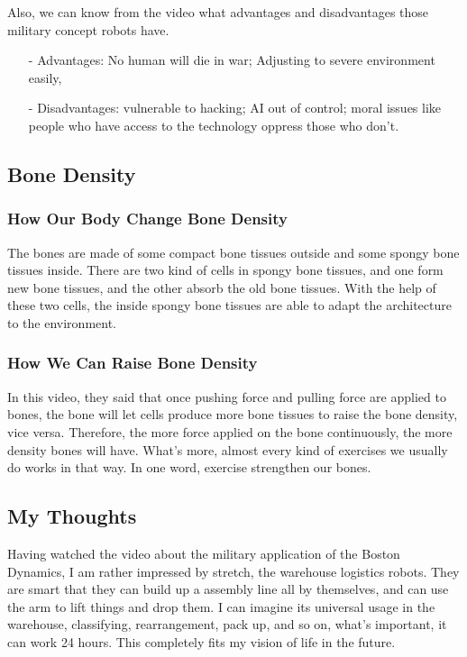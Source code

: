 \documentclass{article}
\begin{document}
Also, we can know from the video what advantages and disadvantages those military concept robots have.
\begin{enumerate}
	\item[-] Advantages: No human will die in war; Adjusting to severe environment easily,
	\item[-] Disadvantages: vulnerable to hacking; AI out of control; moral issues like people who have access to the technology oppress those who don't.
\end{enumerate}

\subsection{Bone Density}
\subsubsection{How Our Body Change Bone Density}
The bones are made of some compact bone tissues outside and some spongy bone tissues inside. There are two kind of cells in spongy bone tissues, and one form new bone tissues, and the other absorb the old bone tissues. With the help of these two cells, the inside spongy bone tissues are able to adapt the architecture to the environment. 

\subsubsection{How We Can Raise Bone Density}
In this video, they said that once pushing force and pulling force are applied to bones, the bone will let cells produce more bone tissues to raise the bone density, vice versa. Therefore, the more force applied on the bone continuously, the more density bones will have. What's more, almost every kind of exercises we usually do works in that way. In one word, exercise strengthen our bones.

\subsection{My Thoughts}
Having watched the video about the military application of the Boston Dynamics, I am rather impressed by stretch, the warehouse logistics robots. They are smart that they can build up a assembly line all by themselves, and can use the arm to lift things and drop them. I can imagine its universal usage in the warehouse, classifying, rearrangement, pack up, and so on, what's important, it can work 24 hours. This completely fits my vision of life in the future. 
\end{document}

